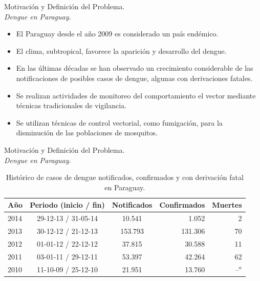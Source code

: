 \begin{frame}[t]{Motivación y Definición del Problema.\\\textit{Dengue en Paraguay.}}
  \begin{center}
    \begin{itemize}
    \item El Paraguay desde el año 2009 es considerado un país endémico.

    \item El clima, subtropical, favorece la aparición y desarrollo del dengue.

    \item En las últimas décadas se han observado un crecimiento considerable de las notificaciones de posibles casos de dengue, algunas con derivaciones fatales.

    \item Se realizan actividades de monitoreo del comportamiento el vector mediante técnicas tradicionales de vigilancia.

    \item Se utilizan técnicas de control vectorial, como fumigación, para la disminución de las poblaciones de mosquitos.
    \end{itemize}
  \end{center}
\end{frame}


\begin{frame}[t]{Motivación y Definición del Problema.\\\textit{Dengue en Paraguay.}}
  \begin{center}
  \begin{table}
      \begin{minipage}{\textwidth}
          \begin{center}
          \caption{Histórico de casos de dengue notificados, confirmados y con derivación fatal en Paraguay.}
          \begin{tabular}{l c c r r}
              \hline
              Año & Periodo (inicio / fin) & Notificados & Confirmados & Muertes\\
              \hline
              \hline
              2014 & 29-12-13 / 31-05-14 & 10.541 & 1.052 & 2\\
              2013 & 30-12-12 / 21-12-13 & 153.793 & 131.306 & 70\\
              2012 & 01-01-12 / 22-12-12 & 37.815 & 30.588 & 11\\
              2011 & 03-01-11 / 29-12-11 & 53.397 & 42.264 & 62\\
              2010 & 11-10-09 / 25-12-10 & 21.951 & 13.760 & --$^a$
          \end{tabular}
          \end{center}
      \end{minipage}
  \end{table}
  \end{center}
\end{frame}

